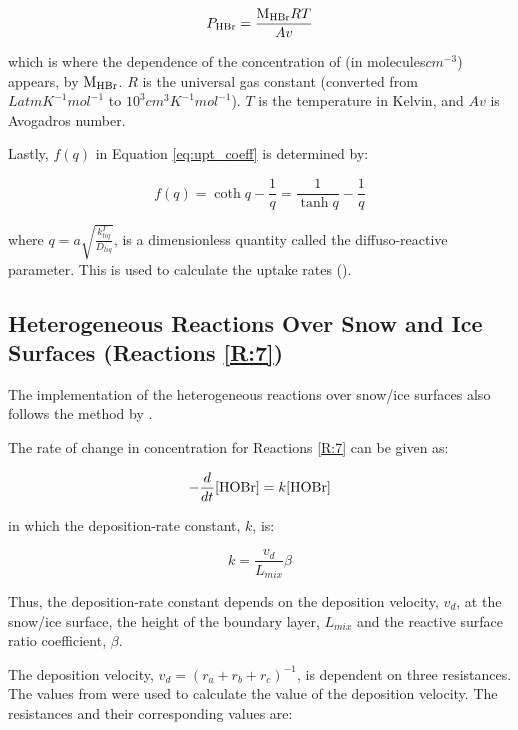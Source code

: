 \begin{equation*}
    P_{\mathrm{HBr}} = \frac{\mathrm{M_{HBr}}RT}{Av}
\end{equation*}

which is where the dependence of the concentration of  (in molecules$cm^{-3}$) appears, by $\mathrm{M_{HBr}}$. $R$ is the universal gas constant (converted from $LatmK^{-1}mol^{-1}$ to $10^3cm^3K^{-1}mol^{-1}$). $T$ is the temperature in Kelvin, and $Av$ is Avogadros number. 

\medskip

Lastly, $f(q)$ in Equation \ref{eq:upt_coeff} is determined by: 

\begin{equation}
    f(q) = \coth{q} -\frac{1}{q} = \frac{1}{\tanh{q}} -\frac{1}{q}
\end{equation}

where $q = a\sqrt{\frac{k_{liq}^I}{D_{liq}}}$, is a dimensionless quantity called the diffuso-reactive parameter. This is used to calculate the uptake rates (\cite{Hanson1994}). 


\subsection{Heterogeneous Reactions Over Snow and Ice Surfaces (Reactions \ref{R:7})}\label{sec:snow_ice_react}


The implementation of the heterogeneous reactions over snow/ice surfaces also follows the method by \cite{CAO}. 

\medskip

The rate of change in concentration for Reactions \ref{R:7} can be given as: 

\begin{equation*}
    -\frac{d}{dt}[\mathrm{HOBr}] = k[\mathrm{HOBr}]
\end{equation*}

in which the deposition-rate constant, $k$, is: 

\begin{equation*}
    k = \frac{v_d}{L_{mix}}\beta
\end{equation*}

Thus, the deposition-rate constant depends on the deposition velocity, $v_d$, at the snow/ice surface, the height of the boundary layer, $L_{mix}$ and the reactive surface ratio coefficient, $\beta$. 

\medskip

The deposition velocity, $v_d = (r_a + r_b + r_c)^{-1}$, is dependent on three resistances. The values from \cite{CAO} were used to calculate the value of the deposition velocity. The resistances and their corresponding values are: 

